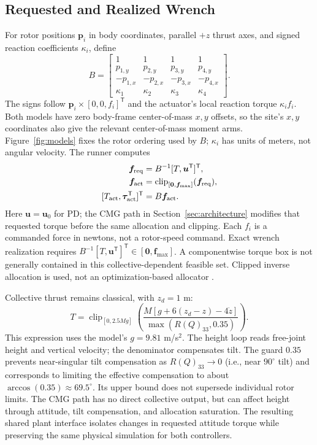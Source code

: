 \documentclass[letterpaper, 10 pt, conference]{ieeeconf}
\newcommand{\T}{^{\mathsf T}}
\newcommand{\clip}{\operatorname{clip}}
\begin{document}
\subsection{Requested and Realized Wrench}
For rotor positions $\bm p_i$ in body coordinates, parallel $+z$ thrust
axes, and signed reaction coefficients $\kappa_i$, define
\begin{equation}
 B=\begin{bmatrix}
 1&1&1&1\\p_{1,y}&p_{2,y}&p_{3,y}&p_{4,y}\\
 -p_{1,x}&-p_{2,x}&-p_{3,x}&-p_{4,x}\\
 \kappa_1&\kappa_2&\kappa_3&\kappa_4
 \end{bmatrix}.
 \label{eq:allocationmatrix}
\end{equation}
The signs follow $\bm p_i\times[0,0,f_i]\T$ and the actuator's local
reaction torque $\kappa_i f_i$. Both models have zero body-frame
center-of-mass $x,y$ offsets, so the site's $x,y$ coordinates also give
the relevant center-of-mass moment arms. Figure~\ref{fig:models} fixes the
rotor ordering used by $B$; $\kappa_i$ has units of meters, not angular
velocity. The runner computes
\begin{equation}
 \begin{aligned}
 \bm f_{\rm req}&=B^{-1}[T,\bm u\T]\T,\\
 \bm f_{\rm act}&=\clip_{[\bm0,\bm f_{\max}]}(\bm f_{\rm req}),\\
 [T_{\rm act},\bm\tau_{\rm act}\T]\T&=B\bm f_{\rm act}.
 \end{aligned}
 \label{eq:mixer}
\end{equation}
Here $\bm u=\bm u_0$ for PD; the CMG path in Section~\ref{sec:architecture}
modifies that requested torque before the same allocation and clipping.
Each $f_i$ is a commanded force in newtons, not a rotor-speed command.
Exact wrench realization requires
$B^{-1}[T,\bm u\T]\T\in[\bm0,\bm f_{\max}]$.
A componentwise torque box is not generally contained in this
collective-dependent feasible set. Clipped inverse allocation is used,
not an optimization-based allocator \cite{monteiro2016allocation}.

Collective thrust remains classical, with $z_d=1$ m:
\begin{equation}
 T=\clip_{[0,2.5Mg]}
 \left(\frac{M[g+6(z_d-z)-4\dot z]}{\max(R(Q)_{33},0.35)}\right).
 \label{eq:collective}
\end{equation}
This expression uses the model's $g=9.81$ m/s$^2$. The height loop reads
free-joint height and vertical velocity; the denominator compensates tilt.
The guard $0.35$ prevents near-singular tilt compensation as $R(Q)_{33}\to0$
(i.e., near $90^\circ$ tilt) and corresponds to limiting the effective
compensation to about $\arccos(0.35)\approx69.5^\circ$. Its upper bound does
not supersede individual rotor limits. The CMG path has no direct collective
output, but can affect height through attitude, tilt compensation, and
allocation saturation.
The resulting shared plant interface isolates changes in requested
attitude torque while preserving the same physical simulation for both
controllers.
\end{document}
